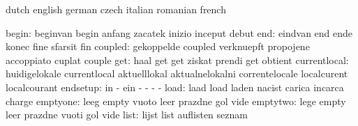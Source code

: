 \stopsetupvariables




\startelements             dutch                     english
                           german                    czech
                           italian                   romanian
                           french

                    begin: beginvan                  begin
                           anfang                    zacatek
                           inizio                    inceput
                           debut
                      end: eindvan                   end
                           ende                      konec
                           fine                      sfarsit
                           fin
                  coupled: gekoppelde                coupled
                           verknuepft                propojene
                           accoppiato                cuplat
                           couple
                      get: haal                      get
                           get                       ziskat
                           prendi                    get
                           obtient
             currentlocal: huidigelokale             currentlocal
                           aktuelllokal              aktualnelokalni
                           correntelocale            localcurent
                           localcourant
                 endsetup: in                        -
                           ein                       -
                           -                         -
                           -
                     load: laad                      load
                           laden                     nacist
                           carica                    incarca
                           charge
                 emptyone: leeg                      empty
                           vuoto                     leer
                           prazdne                   gol
                           vide
                 emptytwo: lege                      empty
                           leer                      prazdne
                           vuoti                     gol
                           vide
                     list: lijst                     list
                           auflisten                 seznam

